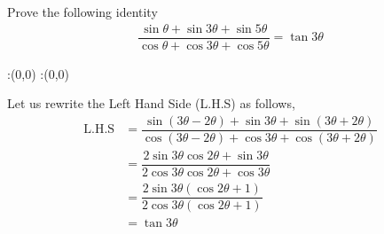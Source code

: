
%
%
%
%
% 
% 

\question[3] Prove the following identity
\begin{align}
  \dfrac{\sin\theta + \sin 3\theta + \sin 5\theta}
  	{\cos \theta + \cos 3\theta + \cos 5\theta} = \tan 3\theta \nonumber
\end{align}


\ifprintanswers
  \begin{marginfigure}
      :(0,0)
      :(0,0)
    \figdrawbegin{}
      \figdrawline [100,101]
    \figdrawend
    \figvisu{\figBoxA}{}{%
    }
    \centerline{\box\figBoxA}
  \end{marginfigure}
\fi 

\begin{solution}[\halfpage]
  Let us rewrite the Left Hand Side (L.H.S) as follows,
  \begin{align}
    \text{L.H.S} &= \dfrac{\sin(3\theta - 2\theta ) + \sin 3\theta + 
    						\sin (3\theta + 2\theta)}
  						  {\cos (3\theta - 2\theta) + \cos 3\theta + 
  							\cos (3\theta + 2\theta)} \\
				 &= \dfrac{2\sin 3\theta \cos 2\theta + \sin 3\theta}
				  		  {2\cos 3\theta \cos 2\theta + \cos 3\theta} \\
				 &= \dfrac{2\sin 3\theta(\cos 2\theta + 1)}
				  		  {2\cos 3\theta(\cos 2\theta + 1)} \\
				 &= \tan 3\theta
  \end{align}
\end{solution}
